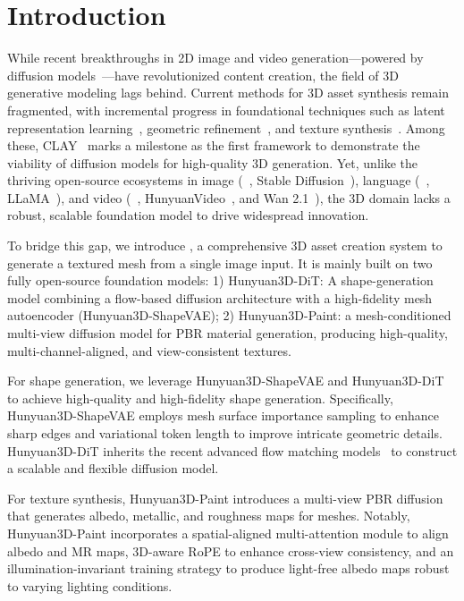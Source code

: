 \section{Introduction}

While recent breakthroughs in 2D image and video generation—powered by diffusion models~\cite{ho2020denoising,rombach2022high,esser2024scaling,li2024hunyuandit,kong2024hunyuanvideo,wan2025}—have revolutionized content creation, the field of 3D generative modeling lags behind. Current methods for 3D asset synthesis remain fragmented, with incremental progress in foundational techniques such as latent representation learning~\cite{zhang20233dshape2vecset}, geometric refinement~\cite{zhao2023michelangelo,li2025triposg,weng2024scaling}, and texture synthesis~\cite{zhang2024clay,jiang2024flexitex,liu2024text}. Among these, CLAY~\cite{zhang2024clay} marks a milestone as the first framework to demonstrate the viability of diffusion models for high-quality 3D generation. Yet, unlike the thriving open-source ecosystems in image (~\eg, Stable Diffusion~\cite{rombach2022high}), language (~\eg, LLaMA~\cite{touvron2023llama}), and video (~\eg, HunyuanVideo~\cite{kong2024hunyuanvideo}, and Wan 2.1~\cite{wan2025}), the 3D domain lacks a robust, scalable foundation model to drive widespread innovation.  




To bridge this gap, we introduce \emph{\methodName}, a comprehensive 3D asset creation system to generate a textured mesh from a single image input. It is mainly built on two fully open-source foundation models: 1) Hunyuan3D-DiT: A shape-generation model combining a flow-based diffusion architecture with a high-fidelity mesh autoencoder (Hunyuan3D-ShapeVAE); 2) Hunyuan3D-Paint: a mesh-conditioned multi-view diffusion model for PBR material generation, producing high-quality, multi-channel-aligned, and view-consistent textures.

For shape generation, we leverage Hunyuan3D-ShapeVAE and Hunyuan3D-DiT to achieve high-quality and high-fidelity shape generation. Specifically, Hunyuan3D-ShapeVAE employs mesh surface importance sampling to enhance sharp edges and variational token length to improve intricate geometric details. Hunyuan3D-DiT inherits the recent advanced flow matching models~\cite{lipman2022flow,esser2024scaling} to construct a scalable and flexible diffusion model.

For texture synthesis, Hunyuan3D-Paint introduces a multi-view PBR diffusion that generates albedo, metallic, and roughness maps for meshes. Notably, Hunyuan3D-Paint incorporates a spatial-aligned multi-attention module to align albedo and MR maps, 3D-aware RoPE to enhance cross-view consistency, and an illumination-invariant training strategy to produce light-free albedo maps robust to varying lighting conditions.

